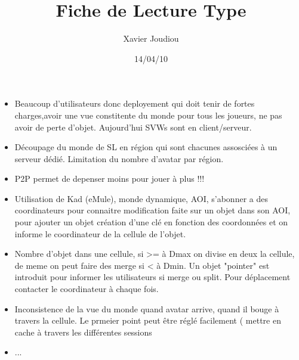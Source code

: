 \documentclass[11pt,a4paper]{article}
\title{Fiche de Lecture Type}
\author{Xavier Joudiou}
\date{14/04/10}
\begin{document}
	
  \begin{itemize}
  \renewcommand{\labelitemi}{$\Rightarrow$}
	\item Beaucoup d'utilisateurs donc deployement qui doit tenir de fortes charges,avoir une vue constitente du monde pour tous les joueurs, ne pas avoir de perte d'objet. Aujourd'hui SVWs sont en client/serveur.
	\item Découpage du monde de SL en région qui sont chacunes assosciées à un serveur dédié. Limitation du nombre d'avatar par région.
	\item P2P permet de depenser moins pour jouer à plus !!!
	\item Utilisation de Kad (eMule), monde dynamique, AOI, s'abonner a des coordinateurs pour connaitre modification faite sur un objet dans son AOI, pour ajouter un objet création d'une clé en fonction des coordonnées et on informe le coordinateur de la cellule de l'objet.
	\item Nombre d'objet dans une cellule, si >= à Dmax on divise en deux la cellule, de meme on peut faire des merge si < à Dmin. Un objet "pointer" est introduit pour informer les utilisateurs si merge ou split. Pour déplacement contacter le coordinateur à chaque fois.
	\item Inconsistence de la vue du monde quand avatar arrive, quand il bouge à travers la cellule. Le prmeier point peut être réglé facilement ( mettre en cache à travers les différentes sessions    
	\item ...
  \end{itemize}
\end{document}
